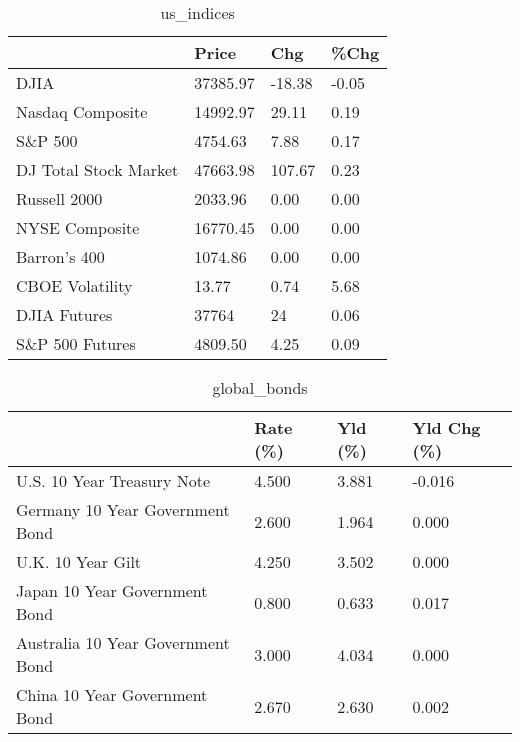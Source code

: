 \documentclass{article}%
\begin{document}
%


\begin{table}[htbp]%
\caption{us\_indices}%
\centering%
\begin{adjustbox}{width=1\textwidth}%
\begin{tabular}{llll}
\toprule
                      &    Price &    Chg &  \%Chg \\
\midrule
                 DJIA & 37385.97 & -18.38 & -0.05 \\
     Nasdaq Composite & 14992.97 &  29.11 &  0.19 \\
              S\&P 500 &  4754.63 &   7.88 &  0.17 \\
DJ Total Stock Market & 47663.98 & 107.67 &  0.23 \\
         Russell 2000 &  2033.96 &   0.00 &  0.00 \\
       NYSE Composite & 16770.45 &   0.00 &  0.00 \\
         Barron's 400 &  1074.86 &   0.00 &  0.00 \\
      CBOE Volatility &    13.77 &   0.74 &  5.68 \\
         DJIA Futures &    37764 &     24 &  0.06 \\
      S\&P 500 Futures &  4809.50 &   4.25 &  0.09 \\
\bottomrule
\end{tabular}
%
\end{adjustbox}%
\end{table}

%


\begin{table}[htbp]%
\caption{global\_bonds}%
\centering%
\begin{adjustbox}{width=1\textwidth}%
\begin{tabular}{llll}
\toprule
                                  & Rate (\%) & Yld (\%) & Yld Chg (\%) \\
\midrule
       U.S. 10 Year Treasury Note &    4.500 &   3.881 &      -0.016 \\
  Germany 10 Year Government Bond &    2.600 &   1.964 &       0.000 \\
                U.K. 10 Year Gilt &    4.250 &   3.502 &       0.000 \\
    Japan 10 Year Government Bond &    0.800 &   0.633 &       0.017 \\
Australia 10 Year Government Bond &    3.000 &   4.034 &       0.000 \\
    China 10 Year Government Bond &    2.670 &   2.630 &       0.002 \\
\bottomrule
\end{tabular}
%
\end{adjustbox}%
\end{table}
\end{document}

